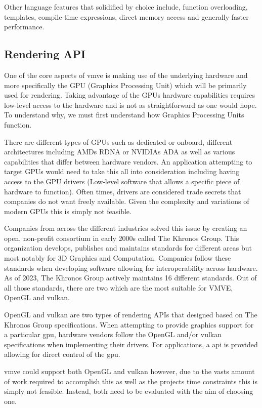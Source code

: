 \documentclass[11pt]{article}
\begin{document}
Other language features that solidified by choice include, function overloading,
templates, compile-time expressions, direct memory access and generally faster
performance.

\subsection{Rendering API} \label{rendering_api}
One of the core aspects of \gls{vmve} is making use of the underlying hardware and
more specifically the GPU (Graphics Processing Unit) which will be primarily
used for rendering. Taking advantage of the GPUs hardware capabilities requires
low-level access to the hardware and is not as straightforward as one would
hope. To understand why, we must first understand how Graphics Processing Units
function.

There are different types of GPUs such as dedicated or onboard, different
architectures including AMDs RDNA \cite{RDNA} or NVIDIAs ADA \cite{ADA} as well
as various capabilities that differ between hardware vendors. An application
attempting to target GPUs would need to take this all into consideration
including having access to the GPU drivers (Low-level software that allows a
specific piece of hardware to function). Often times, drivers are considered
trade secrets that companies do not want freely available. Given the complexity
and variations of modern GPUs this is simply not feasible.

Companies from across the different industries solved this issue by creating
an open, non-profit consortium in early 2000s called The Khronos Group. This
organization develops, publishes and maintains standards for different areas
but most notably for 3D Graphics and Computation. Companies follow these 
standards when developing software allowing for interoperability across
hardware. As of 2023, The Khronos Group actively maintains 16 different
standards. Out of all those standards, there are two which are the most
suitable for VMVE, OpenGL and \gls{vulkan}.

OpenGL and \gls{vulkan} are two types of rendering APIs that designed based on
The Khronos Group specifications. When attempting to provide graphics support
for a particular \gls{gpu}, hardware vendors follow the OpenGL and/or \gls{vulkan}
specifications when implementing their drivers. For applications, a
\acrfull{api} is provided allowing for direct control of the \gls{gpu}.

\gls{vmve} could support both OpenGL and \gls{vulkan} however, due to the vasts
amount of work required to accomplish this as well as the projects time
constraints this is simply not feasible. Instead, both need to be evaluated with
the aim of choosing one.
\end{document}
